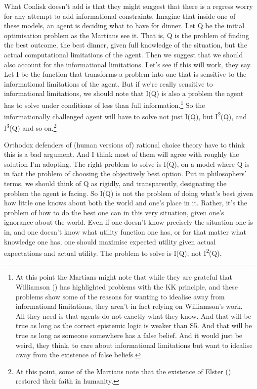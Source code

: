 \documentclass[
  12pt,
  letterpaper,
]{scrbook}
\begin{document}
What Conlisk doesn't add is that they might suggest that there is a
regress worry for any attempt to add informational constraints. Imagine
that inside one of these models, an agent is deciding what to have for
dinner. Let Q be the initial optimisation problem as the Martians see
it. That is, Q is the problem of finding the best outcome, the best
dinner, given full knowledge of the situation, but the actual
computational limitations of the agent. Then we suggest that we should
also account for the informational limitations. Let's see if this will
work, they say. Let I be the function that transforms a problem into one
that is sensitive to the informational limitations of the agent. But if
we're really sensitive to informational limitations, we should note that
I(Q) is also a problem the agent has to solve under conditions of less
than full information.\footnote{At this point the Martians might note
  that while they are grateful that Williamson
  () has highlighted problems with
  the KK principle, and these problems show some of the reasons for
  wanting to idealise away from informational limitations, they aren't
  in fact relying on Williamson's work. All they need is that agents do
  not exactly what they know. And that will be true as long as the
  correct epistemic logic is weaker than S5. And that will be true as
  long as someone somewhere has a false belief. And it would just be
  weird, they think, to care about informational limitations but want to
  idealise away from the existence of false beliefs.} So the
informationally challenged agent will have to solve not just I(Q), but
I\textsuperscript{2}(Q), and I\textsuperscript{3}(Q) and so
on.\footnote{At this point, some of the Martians note that the existence
  of Elster () restored their faith in
  humanity.}

Orthodox defenders of (human versions of) rational choice theory have to
think this is a bad argument. And I think most of them will agree with
roughly the solution I'm adopting. The right problem to solve is I(Q),
on a model where Q is in fact the problem of choosing the objectively
best option. Put in philosophers' terms, we should think of Q as
rigidly, and transparently, designating the problem the agent is facing.
So I(Q) is not the problem of doing what's best given how little one
knows about both the world and one's place in it. Rather, it's the
problem of how to do the best one can in this very situation, given
one's ignorance about the world. Even if one doesn't know precisely the
situation one is in, and one doesn't know what utility function one has,
or for that matter what knowledge one has, one should maximise expected
utility given actual expectations and actual utility. The problem to
solve is I(Q), not I\textsuperscript{2}(Q).
\end{document}
